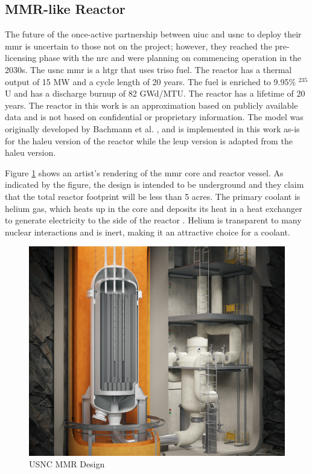 \subsection{MMR-like Reactor}
\label{sec:mmr}

The future of the once-active partnership between \gls{uiuc} and \gls{usnc} to deploy their \gls{mmr} is uncertain to those not on the project; however, they reached the pre-licensing phase with the \gls{nrc} and were planning on commencing operation in the 2030s. The \gls{usnc} \gls{mmr} is a \gls{htgr} that uses \gls{triso} fuel. The reactor has a thermal output of 15 MW and a cycle length of 20 years. The fuel is enriched to 9.95\% $^{235}$U and has a discharge burnup of 82 GWd/MTU. The reactor has a lifetime of 20 years. The reactor in this work is an approximation based on publicly available data and is not based on confidential or proprietary information. The model was originally developed by Bachmann et al. \cite{bachmann_mmr_like_2023}, and is implemented in this work as-is for the \gls{haleu} version of the reactor while the \gls{leup} version is adapted from the \gls{haleu} version.

Figure \ref{fig:mmr_design} shows an artist's rendering of the \gls{mmr} core and reactor vessel. As indicated by the figure, the design is intended to be underground and they claim that the total reactor footprint will be less than 5 acres. The primary coolant is helium gas, which heats up in the core and deposits its heat in a heat exchanger to generate electricity to the side of the reactor \cite{usnc_chalk_river}. Helium is transparent to many nuclear interactions and is inert, making it an attractive choice for a coolant.

\begin{figure}[H]
    \centering
    \includegraphics[scale=0.19]{images/reactor_design/wide-02.png}
    \caption{USNC MMR Design \cite{usnc_design_2021}}
    \label{fig:mmr_design}
\end{figure}

